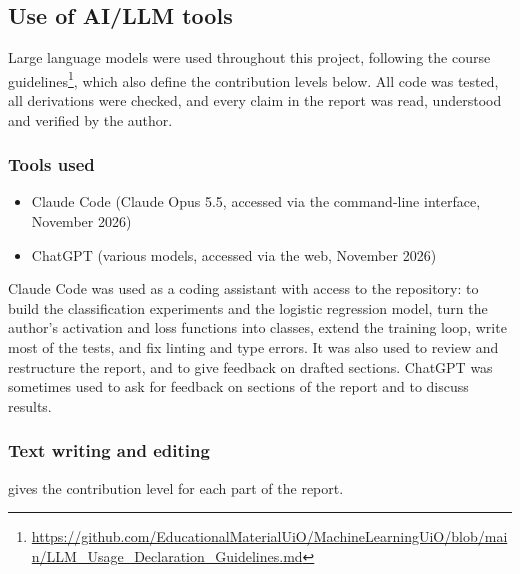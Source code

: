 \subsection{Use of AI/LLM tools}
\label{app:ai-tools}

Large language models were used throughout this project, following the course
guidelines\footnote{\url{https://github.com/EducationalMaterialUiO/MachineLearningUiO/blob/main/LLM_Usage_Declaration_Guidelines.md}},
which also define the contribution levels below. All code was tested, all
derivations were checked, and every claim in the report was read, understood
and verified by the author.

\subsubsection{Tools used}
\begin{itemize}
    \item Claude Code (Claude Opus 5.5, accessed via the command-line interface,
    November 2026)
    \item ChatGPT (various models, accessed via the web, November 2026)
\end{itemize}

Claude Code was used as a coding assistant with access to the repository: to build the
classification experiments and the logistic regression model, turn the author's activation
and loss functions into classes, extend the training loop, write most of the tests, and fix
linting and type errors. It was also used to review and restructure the report, and to give feedback on
drafted sections. ChatGPT was sometimes used to ask for feedback on sections of the
report and to discuss results.

\subsubsection{Text writing and editing}
 gives the contribution level for each part
of the report.

